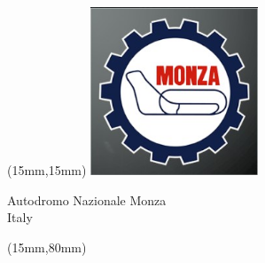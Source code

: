 \null\newpage

\begin{textblock*}{50mm}(15mm,15mm)%
\includegraphics[width=50mm]{LG/2015-05-20_00086.png}
\par Autodromo Nazionale Monza\\ Italy
\end{textblock*}
\begin{textblock*}{185mm}(15mm,80mm)%
\end{textblock*}
